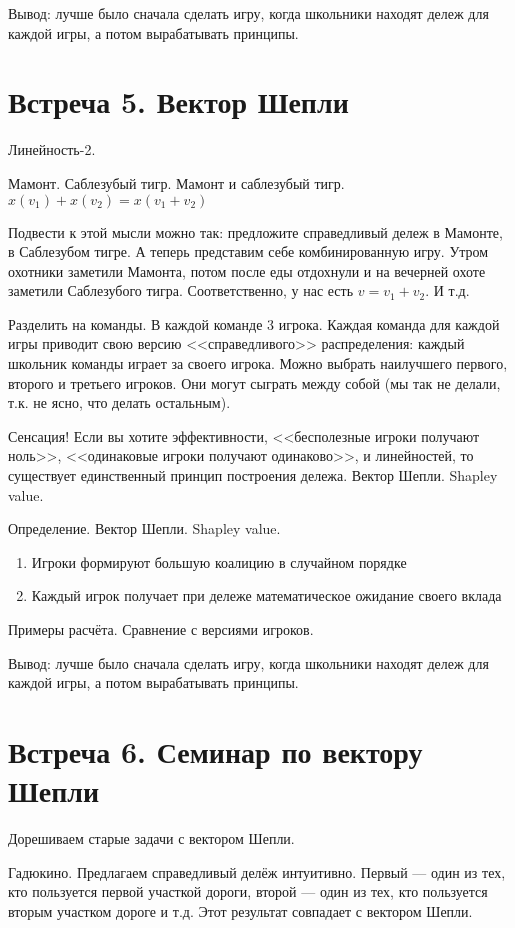 \documentclass[pdftex,12pt,a4paper]{article}
\begin{document}
Вывод: лучше было сначала сделать игру, когда школьники находят дележ для каждой игры, а потом вырабатывать принципы.


\section{Встреча 5. Вектор Шепли}


Линейность-2.


Мамонт. Саблезубый тигр. Мамонт и саблезубый тигр. $x(v_1)+x(v_2)=x(v_1+v_2)$


Подвести к этой мысли можно так: предложите справедливый дележ в Мамонте, в Саблезубом тигре. А теперь представим себе комбинированную игру. Утром охотники заметили Мамонта, потом после еды отдохнули и на вечерней охоте заметили Саблезубого тигра. Соответственно, у нас есть $v=v_1+v_2$. И т.д.


Разделить на команды. В каждой команде 3 игрока. Каждая команда для каждой игры приводит свою версию <<справедливого>> распределения: каждый школьник команды играет за своего игрока. Можно выбрать наилучшего первого, второго и третьего игроков. Они могут сыграть между собой (мы так не делали, т.к. не ясно, что делать остальным).


Сенсация! Если вы хотите эффективности, <<бесполезные игроки получают ноль>>, <<одинаковые игроки получают одинаково>>, и линейностей, то существует единственный принцип построения дележа. Вектор Шепли. Shapley value. 


Определение. Вектор Шепли. Shapley value. 
\begin{enumerate}
\item Игроки формируют большую коалицию в случайном порядке
\item Каждый игрок получает при дележе математическое ожидание своего вклада
\end{enumerate}


Примеры расчёта. Сравнение с версиями игроков.



Вывод: лучше было сначала сделать игру, когда школьники находят дележ для каждой игры, а потом вырабатывать принципы.


\section{Встреча 6. Семинар по вектору Шепли}

Дорешиваем старые задачи с вектором Шепли. 


Гадюкино. Предлагаем справедливый делёж интуитивно. Первый --- один из тех, кто пользуется первой участкой дороги, второй --- один из тех, кто пользуется вторым участком дороге и т.д. Этот результат совпадает с вектором Шепли.
\end{document}
